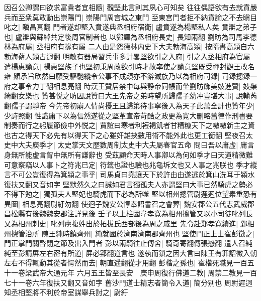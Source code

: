因召公卿謂曰欲求富貴者宜相隨|{
	觀堅此言則其夙心可知矣}
往往偶語欲有去就賁嚴兵而至衆莫敢動出崇陽門|{
	崇陽門周宫城之東門}
至東宫門者拒不納賁諭之不去瞋目叱之|{
	瞋昌真翻}
門者遂却堅入賁遂典丞相府宿衛|{
	盧賁遂為楊堅私人矣}
賁辯之弟子也|{
	盧辯與蘇綽共定後周官制者也}
以鄭譯為丞相府長史|{
	長知兩翻}
劉昉為司馬李德林為府屬|{
	丞相府有掾有屬}
二人由是怨德林内史下大夫勃海高熲|{
	按隋書高熲自六勃海蓨人熲古迥翻}
明敏有器局習兵事多計畧堅欲引之入府|{
	引之入丞相府為官屬}
遣楊惠諭意|{
	楊惠堅族子也堅初秉周政欲引時才故率使之諭意堅既受禪封觀王改名雍}
熲承旨欣然曰願受驅馳縱令公事不成熲亦不辭滅族乃以為相府司録|{
	司録摠録一府之事令力丁翻相息亮翻}
時漢王贊居禁中每與静帝同帳而坐劉昉飾美妓進贊|{
	妓渠綺翻女樂也}
贊甚悦之昉因說贊曰大王先帝之弟時望所歸孺子幼冲豈堪大事|{
	說輸芮翻孺子謂靜帝}
今先帝初崩人情尚擾王且歸第待事寧後入為天子此萬全計也贊年少|{
	少詩照翻}
性識庸下以為信然遂從之堅革宣帝苛酷之政更為寛大删略舊律作刑書要制奏而行之躬履節儉中外悦之|{
	賈誼曰寒者利裋褐飢者甘糟糠天下之嗷嗷新主之資也古之得天下必先有以得天下之心雖奸雄挾數用術不能外此也更工衡翻}
堅夜召太史中大夫庾季才|{
	太史掌天文歷數周制太史中大夫屬春官五命}
問曰吾以庸虚|{
	庸言身無所能虚言胷中無所有謙辭也}
受茲顧命天時人事卿以為何如季才曰天道精微難可意察竊以人事卜之符兆已定|{
	符籤也證也驗也兆龜坼文也又人事之兆朕也}
季才縱言不可公豈復得為箕潁之事乎|{
	司馬貞曰堯讓天下於許由由遂逃於箕山洗耳于潁水復扶又翻又音如字}
堅默然久之曰誠如君言獨孤夫人亦謂堅曰大事已然騎虎之勢必不得下勉之|{
	獨孤夫人堅妃也騎虎而下必為所噬}
堅以相州摠管尉遲迥位望素重恐有異圖|{
	相息亮翻尉紆勿翻}
使迥子魏安公惇奉詔書召之會葬|{
	魏安郡公五代志武威郡昌松縣有後魏魏安郡注詳見後}
壬子以上柱國韋孝寛為相州摠管又以小司徒叱列長乂為相州刺史|{
	叱列虜複姓出於拓拔氏西部後為周之戚里}
先令赴鄴孝寛續進|{
	鄴相州摠管治所}
陳王純時鎮齊州|{
	純就國於濟南濟南郡齊州也}
堅使門正上士崔彭徵之|{
	門正掌門關啓閉之節及出入門者}
彭以兩騎往止傳舍|{
	騎奇寄翻傳張戀翻}
遣人召純純至彭請屏左右密有所道|{
	屏必郢翻道言也}
遂執而鎻之因大言曰陳王有罪詔徵入朝左右不得輒動其從者愕然而去|{
	朝直遥翻從才用翻}
彭楷之孫也|{
	崔楷死職見一百五十一卷梁武帝大通元年}
六月五王皆至長安　庚申周復行佛道二教|{
	周禁二教見一百七十一卷六年復扶又翻又音如字}
舊沙門道士精志者簡令入道|{
	簡分别也}
周尉遲迥知丞相堅將不利於帝室謀舉兵討之|{
	尉紆}


